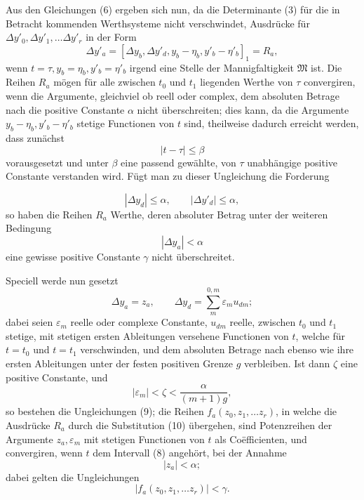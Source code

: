 \documentclass[11pt,a4paper,leqno]{article}
\begin{document}
Aus den Gleichungen (6) ergeben sich nun, da die Determinante (3) für die
in Betracht kommenden Werthsysteme nicht verschwindet, Ausdrücke für
$\Delta y'_0,\Delta y'_1,\ldots\Delta y'_r$ in der Form
\begin{equation}\tag{7}
\Delta y'_a=[\Delta y_b,\Delta y'_d,y_b-\eta_b,y'_b-\eta'_b]_1=R_a,
\end{equation}
wenn $t=\tau,y_b=\eta_b,y'_b=\eta'_b$ irgend eine Stelle der
Mannigfaltigkeit $\mathfrak M$ ist. Die Reihen $R_a$ mögen für alle
zwischen $t_0$ und $t_1$ liegenden Werthe von $\tau$ convergiren, wenn
die Argumente, gleichviel ob reell oder complex, dem absoluten Betrage
nach die positive Constante $\alpha$ nicht überschreiten; dies kann, da
die Argumente $y_b-\eta_b,y'_b-\eta'_b$ stetige Functionen von $t$ sind,
theilweise dadurch erreicht werden, dass zunächst
\begin{equation}\tag{8}
|t-\tau|\leq\beta
\end{equation}
vorausgesetzt und unter $\beta$ eine passend gewählte, von $\tau$
unabhängige positive Constante verstanden wird. Fügt man zu dieser
Ungleichung die Forderung

\begin{equation}\tag{9}
|\Delta y_d|\leq\alpha,\qquad |\Delta y'_d|\leq\alpha,
\end{equation}
so haben die Reihen $R_a$ Werthe, deren absoluter Betrag unter der
weiteren Bedingung
\[
|\Delta y_a|<\alpha
\]
eine gewisse positive Constante $\gamma$ nicht überschreitet.

Speciell werde nun gesetzt
\begin{equation}\tag{10}
\Delta y_a=z_a,\qquad
\Delta y_d=\sum_m^{0,m}\varepsilon_m u_{dm};
\end{equation}
dabei seien $\varepsilon_m$ reelle oder complexe Constante,
$u_{dm}$ reelle, zwischen $t_0$ und $t_1$ stetige, mit stetigen ersten
Ableitungen versehene Functionen von $t$, welche für $t=t_0$ und $t=t_1$
verschwinden, und dem absoluten Betrage nach ebenso wie ihre ersten
Ableitungen unter der festen positiven Grenze $g$ verbleiben. Ist dann
$\zeta$ eine positive Constante, und
\[
|\varepsilon_m|<\zeta<\frac{\alpha}{(m+1)g},
\]
so bestehen die Ungleichungen (9); die Reihen
$f_a(z_0,z_1,\ldots z_r)$, in welche die Ausdrücke $R_a$ durch die
Substitution (10) übergehen, sind Potenzreihen der Argumente
$z_a,\varepsilon_m$ mit stetigen Functionen von $t$ als Coëfficienten,
und convergiren, wenn $t$ dem Intervall (8) angehört, bei der Annahme
\[
|z_a|<\alpha;
\]
dabei gelten die Ungleichungen
\begin{equation}\tag{11}
|f_a(z_0,z_1,\ldots z_r)|<\gamma.
\end{equation}
\end{document}
